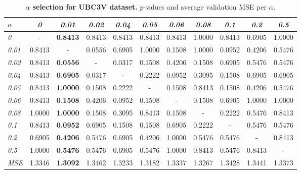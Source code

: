 \documentclass[review,12pt,3p]{elsarticle}
\begin{document}
\begin{table}[t]
\caption{\textbf{$\alpha$ selection for UBC3V dataset.} $p$-values and average validation MSE per $\alpha$.}
\label{tab:statsAL1UBC3V}
\scriptsize %
\begin{center}
\setlength{\tabcolsep}{0.2em} %
\begin{tabular}{|l|c c c c c c c c c c|}
\hline
 $\alpha$ & \emph{0} &\emph{0.01} & \emph{0.02} & \emph{0.04}&\emph{0.05} & \emph{0.06}& \emph{0.08}& \emph{0.1}& \emph{0.2}& \emph{0.5}\\
\hline \emph{0} & - & \textbf{0.8413} & 0.8413 & 0.8413 & 0.8413 & 0.8413 & 1.0000 & 0.8413 & 0.6905 & 1.0000  \\
  \hline \emph{0.01} & 0.8413 & - & 0.0556 & 0.6905 & 1.0000 & 0.1508 & 1.0000 & 0.0952 & 0.4206 & 0.5476  \\
  \hline \emph{0.02} & 0.8413 & \textbf{0.0556} & - & 0.0317 & 0.1508 & 0.4206 & 0.1508 & 0.6905 & 0.5476 & 0.5476  \\
  \hline \emph{0.04} & 0.8413 & \textbf{0.6905} & 0.0317 & - & 0.2222 & 0.0952 & 0.3095 & 0.1508 & 0.6905 & 0.6905  \\
  \hline \emph{0.05} & 0.8413 & \textbf{1.0000} & 0.1508 & 0.2222 & - & 0.1508 & 0.8413 & 0.1508 & 0.4206 & 0.5476  \\
  \hline \emph{0.06} & 0.8413 & \textbf{0.1508} & 0.4206 & 0.0952 & 0.1508 & - & 0.1508 & 0.6905 & 1.0000 & 1.0000  \\
  \hline \emph{0.08} & 1.0000 & \textbf{1.0000} & 0.1508 & 0.3095 & 0.8413 & 0.1508 & - & 0.2222 & 0.5476 & 0.8413  \\
  \hline \emph{0.1} & 0.8413 & \textbf{0.0952} & 0.6905 & 0.1508 & 0.1508 & 0.6905 & 0.2222 & - & 0.5476 & 0.5476  \\
  \hline \emph{0.2} & 0.6905 & \textbf{0.4206} & 0.5476 & 0.6905 & 0.4206 & 1.0000 & 0.5476 & 0.5476 & - & 0.8413  \\
  \hline \emph{0.5} & 1.0000 & \textbf{0.5476} & 0.5476 & 0.6905 & 0.5476 & 1.0000 & 0.8413 & 0.5476 & 0.8413 & -  \\
\hline 
\hline
\textit{MSE} &  1.3346  &   \textbf{1.3092}  &  1.3462  &  1.3233 &   1.3182 &   1.3337 &   1.3267  &  1.3428 &    1.3441 &    1.3373\\
\hline
\end{tabular} 
\end{center}
\end{table}
\end{document}
